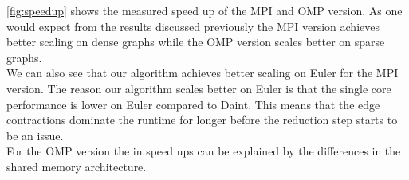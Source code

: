 \autoref{fig:speedup} shows the measured speed up of the MPI  and OMP  version. As one
would expect from the results discussed previously the MPI  version achieves better scaling on dense graphs while the OMP  version scales better on sparse graphs.\\
We can also see that our algorithm achieves better scaling on Euler for the MPI  version. The reason our algorithm scales better on Euler is that the single core performance is lower on Euler compared to Daint. This means that the edge contractions dominate the runtime for longer before the reduction step starts to be an issue.\\
For the OMP  version the  in speed ups can be explained by the differences in the shared memory architecture.

